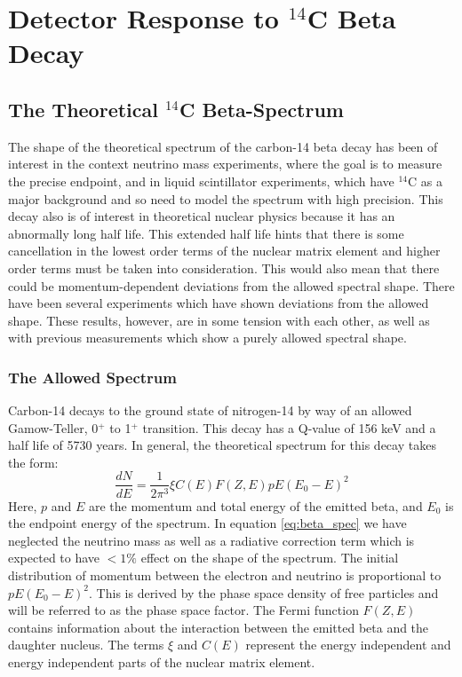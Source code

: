 \chapter{Detector Response to $^{14}$C Beta Decay}

\section{The Theoretical $^{14}$C Beta-Spectrum}
The shape of the theoretical spectrum of the carbon-14 beta decay has been of interest in the context neutrino mass experiments\cite{C14_Wietfeldt}, where the goal is to measure the precise endpoint, and in liquid scintillator experiments, which have $^{14}$C as a major background and so need to model the spectrum with high precision\cite{C14_Borexino, C14_Bergeron}. This  decay also is of interest in theoretical nuclear physics because it has an abnormally long half life\cite{C14_Kuzminov,C14_Genz,C14_Garcia}. This extended half life hints that there is some cancellation in the lowest order terms of the nuclear matrix element and higher order terms must be taken into consideration. This would also mean that there could be momentum-dependent deviations from the allowed spectral shape. There have been several experiments\cite{C14_Sonntag,C14_Wietfeldt,C14_Borexino,C14_Kuzminov,C14_Bergeron} which have shown deviations from the allowed shape. These results, however, are in some tension with each other, as well as with previous measurements which show a purely allowed spectral shape\cite{C14_Curran}.

\subsection{The Allowed Spectrum}
Carbon-14 decays to the ground state of nitrogen-14 by way of an allowed Gamow-Teller, 0$^+$ to 1$^+$ transition. This decay has a Q-value of 156 keV and a half life of 5730 years. In general, the theoretical spectrum for this decay takes the form\cite{C14_Kuzminov}:
\begin{equation}\label{eq:beta_spec}
\frac{dN}{dE}=\frac{1}{2\pi^3} \xi C(E) F(Z,E) pE(E_0-E)^2
\end{equation}
Here, $p$ and $E$ are the momentum and total energy of the emitted beta, and $E_0$ is the endpoint energy of the spectrum. In equation \ref{eq:beta_spec} we have neglected the neutrino mass as well as a radiative correction term which is expected to have $<1\%$ effect on the shape of the spectrum\cite{C14_Wietfeldt}. The initial distribution of momentum between the electron and neutrino is proportional to $pE(E_0-E)^2$. This is derived by the phase space density of free particles and will be referred to as the phase space factor. The Fermi function $F(Z,E)$ contains information about the interaction between the emitted beta and the daughter nucleus. The terms $\xi$ and  $C(E)$ represent the energy independent and energy independent parts of the nuclear matrix element.

